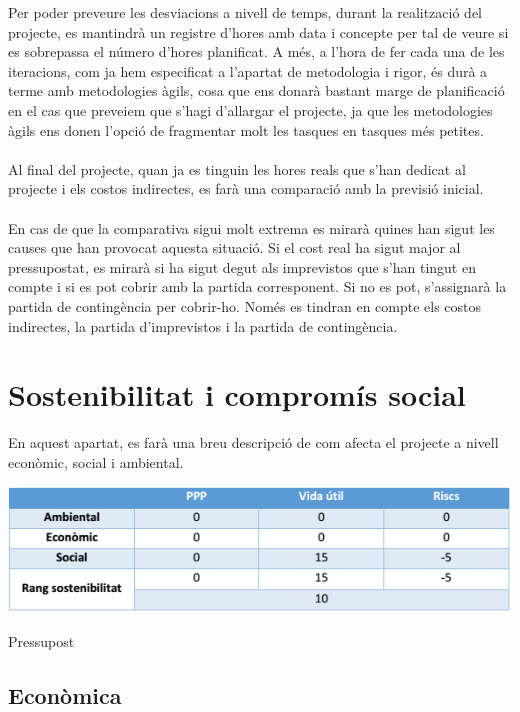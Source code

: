 \documentclass[11pt,catalan,listoffigures,listoftables]{tfgetsinf}
\begin{document}
Per poder preveure les desviacions a nivell de temps, durant la realització del projecte, es mantindrà un registre d’hores amb data i concepte per tal de veure si es sobrepassa el número d’hores planificat. A més, a l’hora de fer cada una de les iteracions, com ja hem especificat a l’apartat de metodologia i rigor, és durà a terme amb metodologies àgils, cosa que ens donarà bastant marge de planificació en el cas que preveiem que s’hagi d’allargar el projecte, ja que les metodologies àgils ens donen l’opció de fragmentar molt les tasques en tasques més petites.\\ \\
Al final del projecte, quan ja es tinguin les hores reals que s’han dedicat al projecte i els costos indirectes, es farà una comparació amb la previsió inicial.\\ \\
En cas de que la comparativa sigui molt extrema es mirarà quines han sigut les causes que han provocat aquesta situació. Si el cost real ha sigut major al pressupostat, es mirarà si ha sigut degut als imprevistos que s’han tingut en compte i si es pot cobrir amb la partida corresponent. Si no es pot, s’assignarà la partida de contingència per cobrir-ho. Només es tindran en compte els costos indirectes, la partida d’imprevistos i la partida de contingència.

\section{Sostenibilitat i compromís social}

En aquest apartat, es farà una breu descripció de com afecta el projecte a nivell econòmic, social i ambiental.

\begin{table}[H]
\centering
\includegraphics[width=15cm]{images/taula7}
\caption[Taula 7.5]{Pressupost}
\centering
\end{table}

\subsection{Econòmica}
\end{document}
